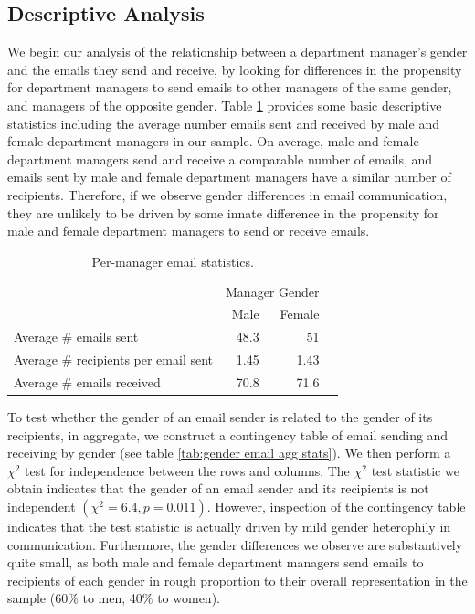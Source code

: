 \documentclass{pnastwo}
\begin{document}
\begin{article}
\section{Descriptive Analysis}

We begin our analysis of the relationship between a department manager's gender and the emails they send and receive, by looking for differences in the propensity for department managers to send emails to other managers of the same gender, and managers of the opposite gender. Table \ref{tab:email agg stats} provides some basic descriptive statistics including the average number emails sent and received by male and female department managers in our sample. On average, male and female department managers send and receive a comparable number of emails, and emails sent by male and female department managers have a similar number of recipients. Therefore, if we observe gender differences in email communication, they are unlikely to be driven by some innate difference in the propensity for male and female department managers to send or receive emails. 
	
\begin{table}
  \centering
  \begin{tabular}{m{2.1in}rrr}
    \toprule
    & \multicolumn{2}{c}{Manager Gender} \\
    \cmidrule{2-3}
    & Male & Female  \\
    \midrule
    Average \# emails sent & 48.3 & 51 \\
    Average \# recipients per email sent & 1.45 & 1.43 \\
    \midrule
    Average \# emails received & 70.8 & 71.6 \\
    \bottomrule
  \end{tabular}
  \caption{\label{tab:email agg stats} Per-manager email
    statistics.}
\end{table}

To test whether the gender of an email sender is related to the gender of its recipients, in aggregate, we construct a contingency table of email sending and receiving by gender (see table \ref{tab:gender email agg stats}). We then perform a $\chi^2$ test for independence between the rows and columns. The $\chi^2$ test statistic we obtain indicates that the gender of an email sender and its recipients is not independent $(\chi^2 = 6.4, p = 0.011)$. However, inspection of the contingency table indicates that the test statistic is actually driven by mild gender heterophily in communication. Furthermore, the gender differences we observe are substantively quite small, as both male and female department managers send emails to recipients of each gender in rough proportion to their overall representation in the sample (60\% to men, 40\% to women).    
	

\end{article}
\end{document}
